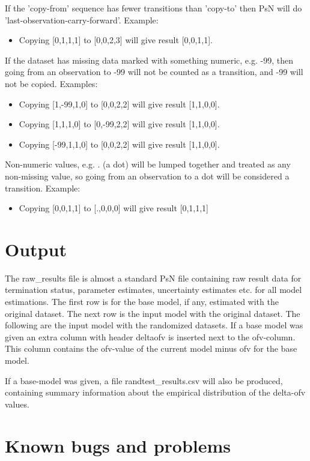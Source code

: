\noindent If the 'copy-from' sequence has fewer transitions than 'copy-to' then PsN will do 'last-observation-carry-forward'. Example:
\begin{itemize}
\item Copying [0,1,1,1] to [0,0,2,3] will give result [0,0,1,1]. 
\end{itemize}
\noindent If the dataset has missing data marked with something numeric, e.g. -99, then going from an observation to -99 will not be counted as a transition, and -99 will not be copied. Examples:
\begin{itemize}
\item Copying [1,-99,1,0] to [0,0,2,2] will give result [1,1,0,0]. 
\item Copying [1,1,1,0] to [0,-99,2,2] will give result [1,1,0,0].
\item Copying [-99,1,1,0] to [0,0,2,2] will give result [1,1,0,0]. 
\end{itemize}

\noindent Non-numeric values, e.g. . (a dot) will be lumped together and treated as any non-missing value, so going from an observation to a dot will be considered a transition. Example:
\begin{itemize}
\item Copying [0,0,1,1] to  [.,0,0,0] will give result [0,1,1,1] 
\end{itemize}

\section{Output}

The raw\_results file is almost a standard PsN file containing raw result data for termination status, parameter estimates, uncertainty estimates etc. for all model estimations. The first row is for the base model, if any, estimated with the original dataset. The next row is the input model with the original dataset. The following are the input model with the randomized datasets. If a base model was given an extra column with header deltaofv is inserted next to the ofv-column. This column contains the ofv-value of the current model minus ofv for the base model.

If a base-model was given, a file randtest\_results.csv will also be produced, 
containing summary information about the empirical distribution of the
delta-ofv values.

\section{Known bugs and problems}

